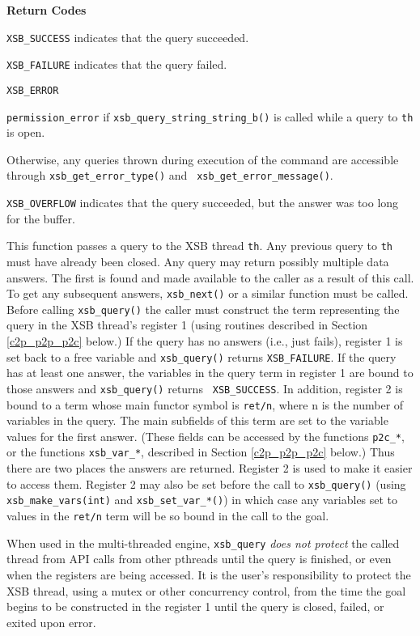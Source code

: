 \begin{description}
{\bf Return Codes}  
\bi
\item {\tt XSB\_SUCCESS} indicates that the query succeeded.
%
\item {\tt XSB\_FAILURE} indicates that the query failed.
%
\item {\tt XSB\_ERROR} 
\bi
\item {\tt permission\_error} if {\tt xsb\_query\_string\_string\_b()}
  is called while a query to {\tt th} is open.
%
\item Otherwise, any queries thrown during execution of the command
  are accessible through {\tt xsb\_get\_error\_type()} and {\tt
    xsb\_get\_error\_message()}.
\ei

\item {\tt XSB\_OVERFLOW} indicates that the query succeeded, but the
  answer was too long for the buffer.
%
\ei

%
This function passes a query to the XSB thread {\tt th}.  Any previous
query to {\tt th} must have already been closed.  Any query may return
possibly multiple data answers.  The first is found and made available
to the caller as a result of this call.  To get any subsequent
answers, {\tt xsb\_next()} or a similar function must be called.
Before calling {\tt xsb\_query()} the caller must construct the term
representing the query in the XSB thread's register 1 (using routines
described in Section \ref{c2p_p2p_p2c} below.)  If the query has no
answers (i.e., just fails), register 1 is set back to a free variable
and {\tt xsb\_query()} returns {\tt XSB\_FAILURE}.  If the query has
at least one answer, the variables in the query term in register 1 are
bound to those answers and {\tt xsb\_query()} returns {\tt
  XSB\_SUCCESS}.  In addition, register 2 is bound to a term whose
main functor symbol is {\tt ret/n}, where n is the number of variables
in the query. The main subfields of this term are set to the variable
values for the first answer. (These fields can be accessed by the
functions {\tt p2c\_*}, or the functions {\tt xsb\_var\_*}, described
in Section \ref{c2p_p2p_p2c} below.)  Thus there are two places the
answers are returned. Register 2 is used to make it easier to access
them.  Register 2 may also be set before the call to {\tt xsb\_query()}
(using {\tt xsb\_make\_vars(int)} and {\tt xsb\_set\_var\_*()}) in
which case any variables set to values in the {\tt ret/n} term will be
so bound in the call to the goal.

When used in the multi-threaded engine, {\tt xsb\_query} {\em does not
  protect} the called thread from API calls from other pthreads until
the query is finished, or even when the registers are being accessed.
It is the user's responsibility to protect the XSB thread, using a
mutex or other concurrency control, from the time the goal begins to
be constructed in the register 1 until the query is closed, failed, or
exited upon error.


\end{description}
